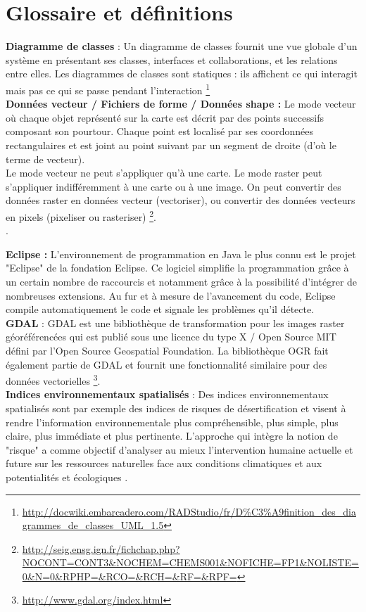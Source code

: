 \chapter{Glossaire et définitions}


\textbf{Diagramme de classes} : Un diagramme de classes fournit une vue globale d'un système en présentant ses classes, interfaces et collaborations, et les relations entre elles. Les diagrammes de classes sont statiques : ils affichent ce qui interagit mais pas ce qui se passe pendant l'interaction \footnote{\url{http://docwiki.embarcadero.com/RADStudio/fr/D\%C3\%A9finition_des_diagrammes_de_classes_UML_1.5}} \\

\textbf{Données vecteur / Fichiers de forme / Données shape : } Le mode vecteur où chaque objet représenté sur la carte est décrit par des points successifs composant son pourtour. Chaque point est localisé par ses coordonnées rectangulaires et est joint au point suivant par un segment de droite (d'où le terme de vecteur).\\

Le mode vecteur ne peut s'appliquer qu'à une carte. Le mode raster peut s'appliquer indifféremment à une carte ou à une image. On peut convertir des données raster en données vecteur (vectoriser), ou convertir des données vecteurs en pixels (pixeliser ou rasteriser) \footnote{\url{http://seig.ensg.ign.fr/fichchap.php?NOCONT=CONT3&NOCHEM=CHEMS001&NOFICHE=FP1&NOLISTE=0&N=0&RPHP=&RCO=&RCH=&RF=&RPF=}}. \\. 

\textbf{Eclipse : }
L'environnement de programmation en Java le plus connu est le projet "Eclipse" de la fondation Eclipse. Ce logiciel simplifie la programmation grâce à un certain nombre de raccourcis et notamment grâce à la possibilité d'intégrer de nombreuses extensions. Au fur et à mesure de l'avancement du code, Eclipse compile automatiquement le code et signale les problèmes qu'il détecte. \\

\textbf{GDAL} : GDAL est une bibliothèque de transformation pour les images raster géoréférencées qui est publié sous une licence du type X / Open Source MIT défini par l'Open Source Geospatial Foundation. La bibliothèque OGR fait également partie de GDAL et fournit une fonctionnalité similaire pour des données vectorielles \footnote{\url{http://www.gdal.org/index.html}}. \\

\textbf{Indices environnementaux spatialisés }: Des indices environnementaux spatialisés sont par exemple des indices de risques de désertification et visent à rendre l'information environnementale plus compréhensible, plus simple, plus claire, plus immédiate et plus pertinente. L'approche qui intègre la notion de "risque" a comme objectif d’analyser au mieux l'intervention humaine actuelle et future sur les ressources naturelles face aux conditions climatiques et aux potentialités et écologiques \citep{SIEL2012}. \\

